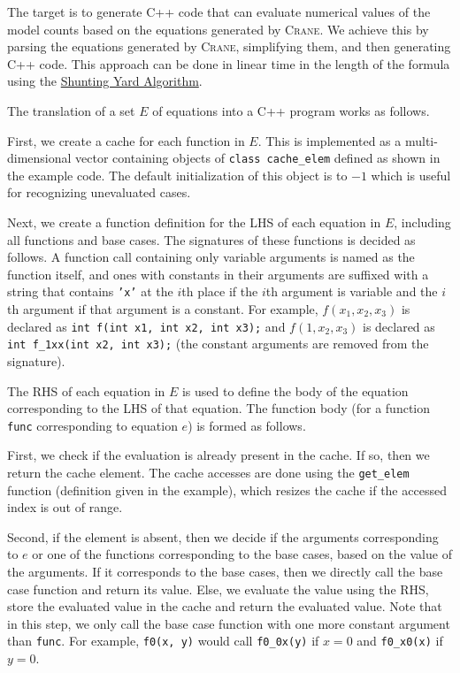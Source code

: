 \documentclass{article}
\begin{document}
The target is to generate C++ code that can evaluate numerical values of the
model counts based on the equations generated by \textsc{Crane}. We achieve this
by parsing the equations generated by \textsc{Crane}, simplifying them, and then
generating C++ code. This approach can be done in linear time in the length of
the formula using
the
\href{https://en.wikipedia.org/wiki/Shunting_yard_algorithm#:~:text=In%20computer%20science%2C%20the%20shunting,abstract%20syntax%20tree%20(AST).}{Shunting
  Yard Algorithm}.

The translation of a set $E$ of equations into a C++ program works as follows.

First, we create a cache for each function in $E$. This is implemented as a
multi-dimensional vector containing objects of \texttt{class cache\_elem}
defined as shown in the example code. The default initialization of this object
is to $-1$ which is useful for recognizing unevaluated cases.

Next, we create a function definition for the LHS of each equation in $E$,
including all functions and base cases. The signatures of these functions is
decided as follows. A function call containing only variable arguments is named
as the function itself, and ones with constants in their arguments are suffixed
with a string that contains \texttt{'x'} at the $i$th place if the $i$th
argument is variable and the $i$th argument if that argument is a constant. For
example, $f(x_{1}, x_{2}, x_{3})$ is declared as \texttt{int f(int x1, int x2,
  int x3);} and $f(1, x_{2}, x_{3})$ is declared as \texttt{int f\_1xx(int x2,
  int x3);} (the constant arguments are removed from the signature).

The RHS of each equation in $E$ is used to define the body of the equation
corresponding to the LHS of that equation. The function body (for a function
\texttt{func} corresponding to equation $e$) is formed as follows.

First, we check if the evaluation is already present in the cache. If so, then
we return the cache element. The cache accesses are done using the
\texttt{get\_elem} function (definition given in the example), which resizes the
cache if the accessed index is out of range.

Second, if the element is absent, then we decide if the arguments corresponding
to $e$ or one of the functions corresponding to the base cases, based on the
value of the arguments. If it corresponds to the base cases, then we directly
call the base case function and return its value. Else, we evaluate the value
using the RHS, store the evaluated value in the cache and return the evaluated
value. Note that in this step, we only call the base case function with one more
constant argument than \texttt{func}. For example, \texttt{f0(x, y)} would call
\texttt{f0\_0x(y)} if $x = 0$ and \texttt{f0\_x0(x)} if $y = 0$.
\end{document}
